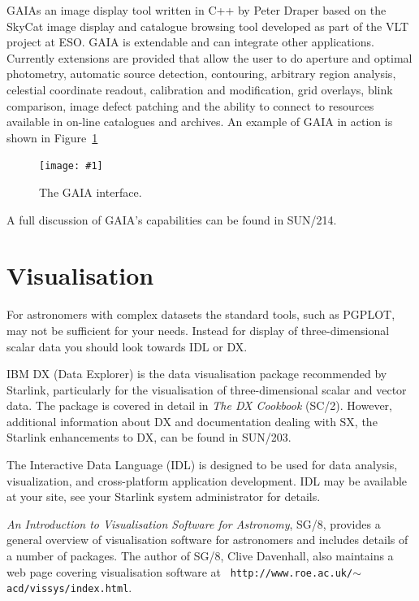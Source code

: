 \documentclass[twoside,11pt]{article}
\newcommand{\htmladdnormallink}[2]{#1}
\newcommand{\htmladdimg}[1]{}
\newcommand{\latex}[1]{#1}
\newcommand{\xref}[3]{#1}
\newcommand{\xlabel}[1]{}
\newcommand{\myfig}[5]{
  \begin{figure}
    \centering\texttt{[image: \#1]}
    \typeout{#1 inserted on page \arabic{page}}
    \caption{\label{#4}#5}
  \end{figure}
  }
\newcommand{\myfig}[5]{
    \label{#4} \htmladdimg{#3}\\
    Figure: #5\\
  }
\begin{document}
\xref{GAIA}{sun214} is an image display tool written in C++ by
\htmladdnormallink{Peter Draper}{mailto:P.W.Draper@durham.ac.uk} based
on the \htmladdnormallink{SkyCat}{http://archive.eso.org/skycat/}
image display and catalogue browsing tool developed as part of the
\htmladdnormallink{VLT}{http://www.eso.org/vlt/} project at
\htmladdnormallink{ESO}{http://www.eso.org/}. GAIA is extendable and
can integrate other applications. Currently extensions are provided
that allow the user to do aperture and optimal photometry, automatic
source detection, contouring, arbitrary region analysis, celestial
coordinate readout, calibration and modification, grid overlays, blink
comparison, image defect patching and the ability to connect to
resources available in on-line catalogues and archives. An example of
GAIA in action is shown in Figure~\ref{sc15_gaia_interface}

\myfig{sc15_gaia.eps}{height=0.7\textheight}{sc15_gaia.gif}{sc15_gaia_interface}{The
GAIA interface.} 

A full discussion of GAIA's capabilities can be found in \xref{SUN/214}{sun214}{}.

\section{\xlabel{sc15_visualisation}Visualisation\label{sc15_visualisation}}

For astronomers with complex datasets the standard tools, such as
PGPLOT, may not be sufficient for your needs. Instead for display of
three-dimensional scalar data you should look towards IDL or DX.

IBM DX (Data Explorer) is the data visualisation package recommended
by Starlink, particularly for the visualisation of three-dimensional
scalar and vector data. The package is covered in detail in \xref{{\em
The DX Cookbook} (SC/2)}{sc2}{}. However, additional information about
DX and documentation dealing with SX, the Starlink enhancements to DX,
can be found in \xref{SUN/203}{sun203}{}.

The \htmladdnormallink{Interactive Data
Language}{http://www.rsinc.com/idl/index.cfm} (IDL) is designed to be
used for data analysis, visualization, and cross-platform application
development. IDL may be available at your site, see your Starlink
system administrator for details.

\xref{{\em An Introduction to Visualisation Software for
Astronomy}}{sg8}{}, SG/8, provides a general overview of visualisation
software for astronomers and includes details of a number of packages.
The author of SG/8, \htmladdnormallink{Clive
Davenhall}{mailto:acd@roe.ac.uk}, also maintains a
\htmladdnormallink{web
page}{http://www.roe.ac.uk/~acd/vissys/index.html} covering
visualisation software\latex{ at {\tt
http://www.roe.ac.uk/$\sim$acd/vissys/index.html}}.
\end{document}
